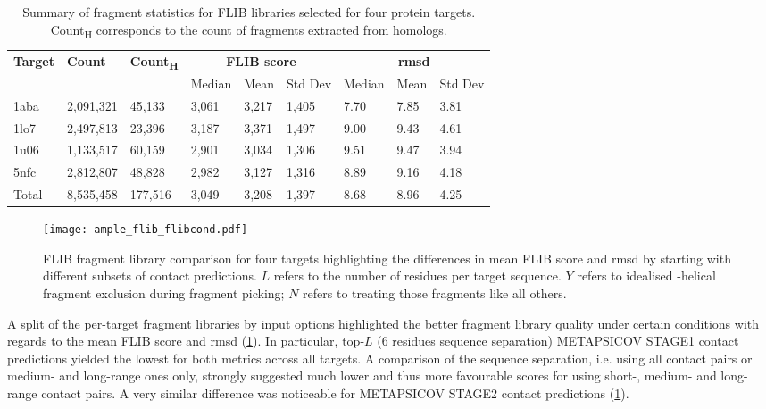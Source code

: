 \begin{table}[H]
  \centering
  \scriptsize
  \caption[FLIB fragment characterics across four protein targets]{Summary of fragment statistics for FLIB libraries selected for four protein targets. Count\textsubscript{H} corresponds to the count of fragments extracted from homologs.}
  \label{table:ample_flib_frag_summary}
  \begin{tabularx}{\textwidth}{X X X X X X X X X}
      \hline
      \multirow{2}{*}{\textbf{Target}} & \multirow{2}{*}{\textbf{Count}} & \multirow{2}{*}{\textbf{Count\textsubscript{H}}} & \multicolumn{3}{c}{\textbf{FLIB score}} & \multicolumn{3}{c}{\textbf{\gls{rmsd}}} \\ \cline{4-9}
      		&			&			& Median 	& Mean 		& Std Dev 	& Median 	& Mean 	& Std Dev \\
      \hline
      1aba	& 2,091,321	& 45,133		& 3,061	& 3,217	& 1,405	& 7.70	& 7.85	& 3.81	\\
	  1lo7	& 2,497,813	& 23,396		& 3,187	& 3,371	& 1,497	& 9.00	& 9.43	& 4.61	\\
      1u06	& 1,133,517	& 60,159		& 2,901	& 3,034	& 1,306	& 9.51	& 9.47	& 3.94	\\
      5nfc	& 2,812,807	& 48,828		& 2,982	& 3,127	& 1,316	& 8.89	& 9.16	& 4.18	\\
      \hline
      Total	& 8,535,458	& 177,516		& 3,049	& 3,208	& 1,397	& 8.68	& 8.96	& 4.25	\\
      \hline
  \end{tabularx}
\end{table}

\begin{figure}[H]
	\centering
	\texttt{[image: ample\_flib\_flibcond.pdf]}
	\caption[FLIB fragment library comparison]{FLIB fragment library comparison for four targets highlighting the differences in mean FLIB score and \gls{rmsd} by starting with different subsets of contact predictions. $L$ refers to the number of residues per target sequence. $Y$ refers to idealised \textalpha-helical fragment exclusion during fragment picking; $N$ refers to treating those fragments like all others.}
	\label{fig:ample_flib_flibcond}
\end{figure}

A split of the per-target fragment libraries by input options highlighted the better fragment library quality under certain conditions with regards to the mean FLIB score and \gls{rmsd} (\cref{fig:ample_flib_flibcond}). In particular, top-$L$ (6 residues sequence separation) METAPSICOV STAGE1 contact predictions yielded the lowest for both metrics across all targets. A comparison of the sequence separation, i.e. using all contact pairs or medium- and long-range ones only, strongly suggested much lower and thus more favourable scores for using short-, medium- and long-range contact pairs. A very similar difference was noticeable for METAPSICOV STAGE2 contact predictions (\cref{fig:ample_flib_flibcond}). 

